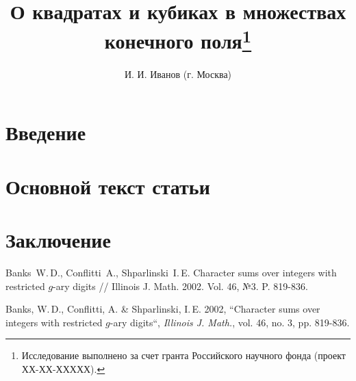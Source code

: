 \documentclass[11pt,twoside,draft
]{article}
\title
{%
О квадратах и кубиках в множествах конечного поля\footnote{Исследование выполнено за счет гранта Российского научного фонда (проект ХХ-ХХ-ХХХХХ).}}
{%
On the squares and cubes in the set of finite fields}
\author
{%
И. И. Иванов (г. Москва)}
{%
I. I. Ivanov (Moscow)}
\begin{document}
\maketitle

\enmaketitle

\section{Введение}

\section{Основной текст статьи}

\section{Заключение}

\begin{thebibliography}{99}
	
	Banks~W.\,D., Conflitti~A., Shparlinski~I.\,E. Character sums over integers with restricted $g$-ary digits // Illinois J. Math. 2002. Vol. 46, №3. P. 819-836.
		

\end{thebibliography}


\begin{engbibliography}{99}
	
	Banks, W.\,D., Conflitti, A. \& Shparlinski, I.\,E. 2002, ``Character sums over integers with restricted $g$-ary digits``, \textit{Illinois J. Math.}, vol. 46, no. 3, pp. 819-836.

\end{engbibliography}

\label{end}
\end{document}
